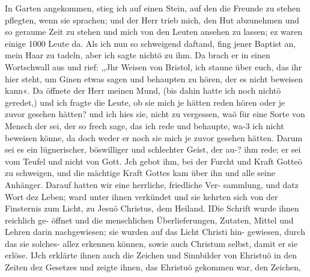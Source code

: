 In Garten angekommen, stieg ich auf
einen Stein, auf den die Freunde zu stehen pflegten, wenn sie
sprachen;
und der Herr trieb mich, den Hut abzunehmen und so
geraume Zeit zu stehen und mich von den Leuten ansehen zu
lassen; ez waren einige 1000 Leute da. Als ich nun so schweigend
daftand, fing jener Baptist an, mein Haar zu tadeln, aber ich
sagte nichtö zu ihm. Da brach er in einen Wortschwall aus und
rief: ,,Jhr Weisen von Bristol, ich staune über euch, das ihr hier
steht, um Ginen etwas sagen und behaupten zu hören, der es
nicht beweisen kann«. Da öffnete der Herr meinen Mund, (bis
dahin hatte ich noch nichtö geredet,) und ich fragte die Leute, ob
sie mich je hätten reden hören oder je zuvor gesehen hätten? und
ich hies sie, nicht zu vergessen, waö für eine Sorte von Mensch
der sei, der so frech sage, das ich rede und behaupte, wa-3 ich
nicht beweisen könne, da doch weder er noch sie mich je zuvor
gesehen hätten. Darum sei es ein lügnerischer, böswilliger und
schlechter Geist, der au-? ihm rede; er sei vom Teufel und nicht
von Gott. Jch gebot ihm, bei der Furcht und Kraft Gotteö zu
schweigen, und die mächtige Kraft Gottes kam über ihn und alle
seine Anhänger. Darauf hatten wir eine herrliche, friedliche Ver-
sammlung, und datz Wort dez Leben; ward unter ihnen verkündet
und sie kehrten sich von der Finsternis zum Licht, zu Jesuö
Christus, dem Heiland. IDie Schrift wurde ihnen reichlich ge-
öffnet und die menschlichen Überlieferungen, Zutaten, Mittel und
Lehren darin nachgewiesen; sie wurden auf das Licht Christi hin-
gewiesen, durch das sie solches- allez erkennen können, sowie auch
Christum selbst, damit er sie erlöse. IJch erklärte ihnen auch die
Zeichen und Sinnbilder von Ehristuö in den Zeiten dez Gesetzes
und zeigte ihnen, das Ehristuö gekommen war, den Zeichen,


